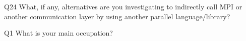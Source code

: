 \begin{description}%
\item{Q24} What, if any, alternatives are you investigating to indirectly call MPI or another communication layer by using another parallel language/library?%
\item{Q1} What is your main occupation?%
\end{description}%
